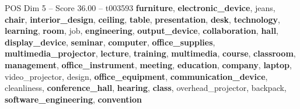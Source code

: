 \begin{textsample}{POS Dim 5 – Score 36.00 – t003593}  \label{ex:f5_pos_008}
\textbf{furniture}, \textbf{electronic\_device}, jeans, \textbf{chair}, \textbf{interior\_design}, \textbf{ceiling}, \textbf{table}, \textbf{presentation}, \textbf{desk}, \textbf{technology}, \textbf{learning}, \textbf{room}, job, \textbf{engineering}, \textbf{output\_device}, \textbf{collaboration}, \textbf{hall}, \textbf{display\_device}, \textbf{seminar}, \textbf{computer}, \textbf{office\_supplies}, \textbf{multimedia\_projector}, \textbf{lecture}, \textbf{training}, \textbf{multimedia}, \textbf{course}, \textbf{classroom}, \textbf{management}, \textbf{office\_instrument}, \textbf{meeting}, \textbf{education}, \textbf{company}, \textbf{laptop}, video\_projector, design, \textbf{office\_equipment}, \textbf{communication\_device}, cleanliness, \textbf{conference\_hall}, \textbf{hearing}, \textbf{class}, overhead\_projector, backpack, \textbf{software\_engineering}, \textbf{convention}

\end{textsample}
